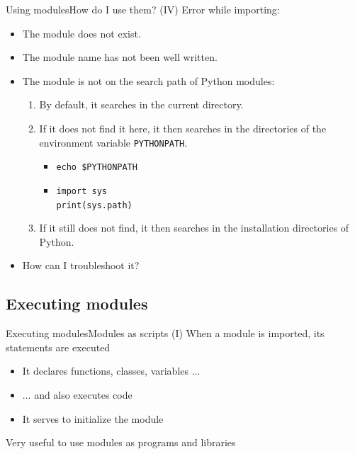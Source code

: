 \documentclass[10pt,compress]{beamer} %
\begin{document}
\begin{frame}[fragile]{Using modules}{How do I use them?  (IV)}
	Error while importing:
	\begin{itemize}
	\item The module does not exist.
	\item The module name has not been well written.
	\item The module is not on the search path of Python modules:
	\begin{enumerate}
	\item By default, it searches in the current directory.
	\item If it does not find it here, it then searches in the directories of the environment variable \texttt{PYTHONPATH}.
	\begin{itemize}
	\item \texttt{echo \$PYTHONPATH}
	\item \texttt{import sys}\\
	\texttt{print(sys.path)}
	\end{itemize}
	\item If it still does not find, it then searches in the installation directories of Python.
	\end{enumerate}
	\item How can I troubleshoot it?
	\end{itemize}
\end{frame} 
	
\subsection{Executing modules}

\begin{frame}{Executing modules}{Modules as scripts (I)}
	When a module is imported, its statements are executed
		\begin{itemize}
		\item It declares functions, classes, variables ...
		\item ... and also executes code
		\item It serves to initialize the module
		\end{itemize}
	Very useful to use modules as programs and libraries
\end{frame}
\end{document}
